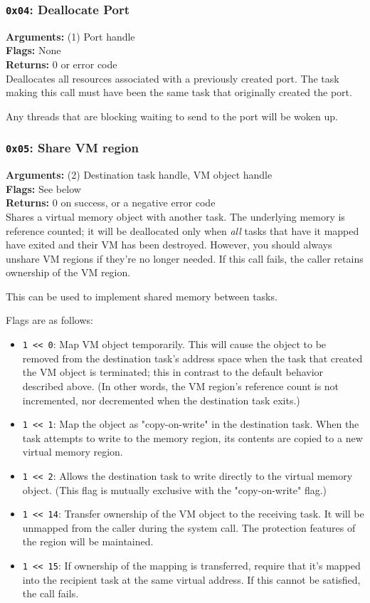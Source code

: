 \documentclass[11pt]{article}
\begin{document}
\subsubsection{{\tt 0x04}: Deallocate Port}
\textbf{Arguments:} (1) Port handle \\
\textbf{Flags:} None \\
\textbf{Returns:} 0 or error code \\

Deallocates all resources associated with a previously created port. The task making this call must have been the same task that originally created the port.

Any threads that are blocking waiting to send to the port will be woken up.

\subsubsection{{\tt 0x05}: Share VM region}
\textbf{Arguments:} (2) Destination task handle, VM object handle \\
\textbf{Flags:} See below \\
\textbf{Returns:} 0 on success, or a negative error code \\

Shares a virtual memory object with another task. The underlying memory is reference counted; it will be deallocated only when \textit{all} tasks that have it mapped have exited and their VM has been destroyed. However, you should always unshare VM regions if they're no longer needed. If this call fails, the caller retains ownership of the VM region.

This can be used to implement shared memory between tasks.

Flags are as follows:

\begin{itemize}
\item \texttt{1 << 0}: Map VM object temporarily. This will cause the object to be removed from the destination task's address space when the task that created the VM object is terminated; this in contrast to the default behavior described above. (In other words, the VM region's reference count is not incremented, nor decremented when the destination task exits.)
\item \texttt{1 << 1}: Map the object as "copy-on-write" in the destination task. When the task attempts to write to the memory region, its contents are copied to a new virtual memory region.
\item \texttt{1 << 2}: Allows the destination task to write directly to the virtual memory object. (This flag is mutually exclusive with the "copy-on-write" flag.)
\item \texttt{1 << 14}: Transfer ownership of the VM object to the receiving task. It will be unmapped from the caller during the system call. The protection features of the region will be maintained.
\item \texttt{1 << 15}: If ownership of the mapping is transferred, require that it's mapped into the recipient task at the same virtual address. If this cannot be satisfied, the call fails.
\end{itemize}
\end{document}
